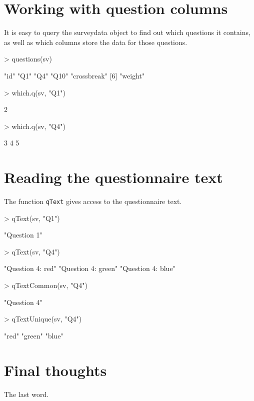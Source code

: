 \documentclass[a4paper]{article}
\begin{document}
\section{Working with question columns}

It is easy to query the surveydata object to find out which questions it contains, as well as which columns store the data for those questions.

\begin{Schunk}
\begin{Sinput}
> questions(sv)
\end{Sinput}
\begin{Soutput}
[1] "id"         "Q1"         "Q4"         "Q10"        "crossbreak"
[6] "weight"    
\end{Soutput}
\begin{Sinput}
> which.q(sv, "Q1")
\end{Sinput}
\begin{Soutput}
[1] 2
\end{Soutput}
\begin{Sinput}
> which.q(sv, "Q4")
\end{Sinput}
\begin{Soutput}
[1] 3 4 5
\end{Soutput}
\end{Schunk}

\section{Reading the questionnaire text}

The function \texttt{qText} gives access to the questionnaire text.

\begin{Schunk}
\begin{Sinput}
> qText(sv, "Q1")
\end{Sinput}
\begin{Soutput}
[1] "Question 1"
\end{Soutput}
\begin{Sinput}
> qText(sv, "Q4")
\end{Sinput}
\begin{Soutput}
[1] "Question 4: red"   "Question 4: green" "Question 4: blue" 
\end{Soutput}
\begin{Sinput}
> qTextCommon(sv, "Q4")
\end{Sinput}
\begin{Soutput}
[1] "Question 4"
\end{Soutput}
\begin{Sinput}
> qTextUnique(sv, "Q4")
\end{Sinput}
\begin{Soutput}
[1] "red"   "green" "blue" 
\end{Soutput}
\end{Schunk}


\section{Final thoughts}

The last word.


\end{document}
